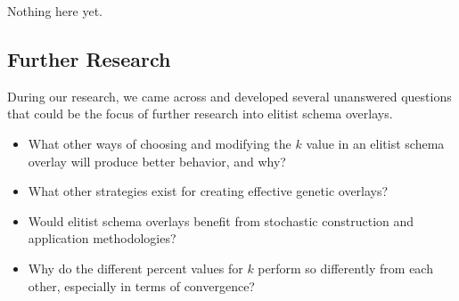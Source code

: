 Nothing here yet.

\subsection*{Further Research}
During our research, we came across and developed several unanswered questions that could be the focus of further research into elitist schema overlays.

\begin{itemize}
\item What other ways of choosing and modifying the $k$ value in an elitist schema overlay will produce better behavior, and why?

\item What other strategies exist for creating effective genetic overlays?

\item Would elitist schema overlays benefit from stochastic construction and application methodologies?

\item Why do the different percent values for $k$ perform so differently from each other, especially in terms of convergence?
\end{itemize}